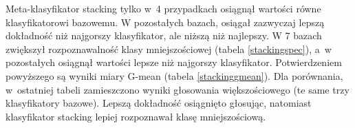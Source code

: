 Meta-klasyfikator stacking tylko w~4 przypadkach osiągnął wartości równe klasyfikatorowi bazowemu. W pozostałych bazach, osiągał zazwyczaj lepszą dokładność niż najgorszy klasyfikator, ale niższą niż najlepszy. W 7 bazach zwiększył rozpoznawalność klasy mniejszościowej (tabela \ref{stackingspec}), a~w pozostałych osiągnął wartości lepsze niż najgorszy klasyfikator. Potwierdzeniem powyższego są wyniki miary G-mean (tabela \ref{stackinggmean}). Dla porównania, w~ostatniej tabeli zamieszczono wyniki głosowania większościowego (te same trzy klasyfikatory bazowe). Lepszą dokładność osiągnięto głosując, natomiast klasyfikator stacking lepiej rozpoznawał klasę mniejszościową.


	\begin{table}[H]
		\tiny
		\begin{center}
\end{center}
\end{table}
